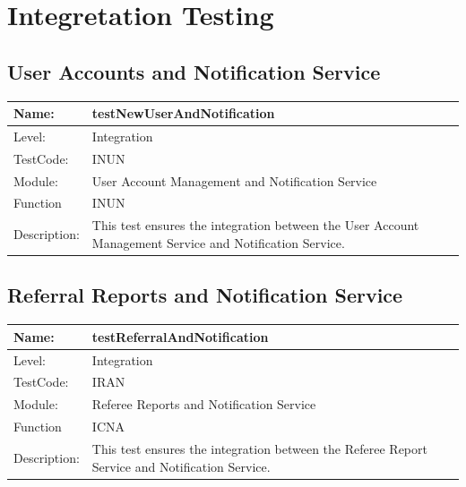 \documentclass[12pt]{article}
\begin{document}
\begin{flushleft}
\begin{center}
\begin{tabular}{|l|p{12cm}|}
\end{tabular}
\end{center}

\newpage
\section{Integretation Testing}

\subsection{User Accounts and Notification Service}
\begin{center}
\begin{tabular}{|l|p{12cm}|}
\hline
 Name: & testNewUserAndNotification  \\
\hline
Level: & Integration \\
\hline
TestCode: & INUN \\
\hline
Module:& User Account Management and Notification Service \\
\hline
Function & INUN \\
\hline
Description: & This test ensures the integration between the User Account Management Service and Notification Service. \\
\hline
\end{tabular}
\end{center}

\subsection{Referral Reports and Notification Service}
\begin{center}
\begin{tabular}{|l|p{12cm}|}
\hline
 Name: & testReferralAndNotification  \\
\hline
Level: & Integration \\
\hline
TestCode: & IRAN \\
\hline
Module:& Referee Reports and Notification Service \\
\hline
Function & ICNA \\
\hline
Description: & This test ensures the integration between the Referee Report Service and Notification Service. \\
\hline
\end{tabular}
\end{center}


\end{flushleft}
\end{document}
